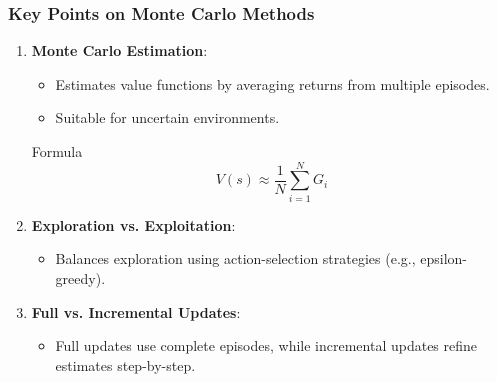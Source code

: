 \documentclass[aspectratio=169]{beamer}
\begin{document}
\begin{frame}[fragile]
    \frametitle{Key Points on Monte Carlo Methods}
    \begin{enumerate}
        \item \textbf{Monte Carlo Estimation}:
            \begin{itemize}
                \item Estimates value functions by averaging returns from multiple episodes.
                \item Suitable for uncertain environments.
            \end{itemize}
            \begin{block}{Formula}
            \begin{equation}
                V(s) \approx \frac{1}{N} \sum_{i=1}^{N} G_i
            \end{equation}
            \end{block}
        
        \item \textbf{Exploration vs. Exploitation}:
            \begin{itemize}
                \item Balances exploration using action-selection strategies (e.g., epsilon-greedy).
            \end{itemize}
        
        \item \textbf{Full vs. Incremental Updates}:
            \begin{itemize}
                \item Full updates use complete episodes, while incremental updates refine estimates step-by-step.
            \end{itemize}
    \end{enumerate}
\end{frame}
\end{document}
